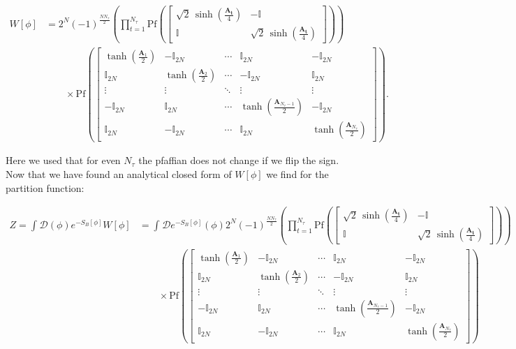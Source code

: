 \documentclass{article}
\begin{document}
\begin{align}
	W\left[ \phi \right] &= 2^{N} (-1)^{\frac{N N_\tau}{2}}
	\left(\prod_{t=1}^{N_\tau} \mathrm{Pf}\!\left(
	\begin{bmatrix}
		\sqrt{2}\,\sinh\!\left(\frac{\boldsymbol{A_t}}{4}\right) & -\mathbb{I} \\
		\mathbb{I} & \sqrt{2}\,\sinh\!\left(\frac{\boldsymbol{A_t}}{4}\right)
	\end{bmatrix}
	\right)\right) \nonumber \\
	&\quad\quad \times
	\mathrm{Pf} \left(	
	\begin{bmatrix}
		\tanh\!\left(\frac{{\boldsymbol{A}_1}}{2}\right) & -\mathbb{I}_{2N} & \cdots & \mathbb{I}_{2N} & -\mathbb{I}_{2N} \\
		\mathbb{I}_{2N} & \tanh\!\left(\frac{{\boldsymbol{A}_2}}{2}\right) & \cdots & -\mathbb{I}_{2N} & \mathbb{I}_{2N} \\
		\vdots & \vdots & \ddots & \vdots & \vdots \\
		-\mathbb{I}_{2N} & \mathbb{I}_{2N} & \cdots & \tanh\!\left(\frac{{\boldsymbol{A}_{N_\tau-1}}}{2}\right) & -\mathbb{I}_{2N} \\
		\mathbb{I}_{2N} & -\mathbb{I}_{2N} & \cdots & \mathbb{I}_{2N} & \tanh\!\left(\frac{{\boldsymbol{A}_{N_\tau}}}{2}\right)
	\end{bmatrix}
	\right).
\end{align}


Here we used that for even $N_{\tau}$ the pfaffian does not change if we flip the sign. Now that we have found an analytical closed form of $W\left[ \phi \right]$ we find for the partition function:


\begin{align}
	Z = \int_{ }^{ } \mathcal{D} \left(\phi\right) e^{-S_B\left[ \phi \right] } W \left[ \phi \right] &= \int_{ }^{ } \mathcal{D} e^{-S_B\left[ \phi \right] } \left(\phi\right) 2^{N} (-1)^{\frac{N N_\tau}{2}}
	\left(\prod_{t=1}^{N_\tau} \mathrm{Pf}\!\left(
	\begin{bmatrix}
		\sqrt{2}\,\sinh\!\left(\frac{\boldsymbol{A_t}}{4}\right) & -\mathbb{I} \\
		\mathbb{I} & \sqrt{2}\,\sinh\!\left(\frac{\boldsymbol{A_t}}{4}\right)
	\end{bmatrix}
	\right)\right) \nonumber \\
	&\quad\quad \times
	\mathrm{Pf} \left(	
	\begin{bmatrix}
		\tanh\!\left(\frac{{\boldsymbol{A}_1}}{2}\right) & -\mathbb{I}_{2N} & \cdots & \mathbb{I}_{2N} & -\mathbb{I}_{2N} \\
		\mathbb{I}_{2N} & \tanh\!\left(\frac{{\boldsymbol{A}_2}}{2}\right) & \cdots & -\mathbb{I}_{2N} & \mathbb{I}_{2N} \\
		\vdots & \vdots & \ddots & \vdots & \vdots \\
		-\mathbb{I}_{2N} & \mathbb{I}_{2N} & \cdots & \tanh\!\left(\frac{{\boldsymbol{A}_{N_\tau-1}}}{2}\right) & -\mathbb{I}_{2N} \\
		\mathbb{I}_{2N} & -\mathbb{I}_{2N} & \cdots & \mathbb{I}_{2N} & \tanh\!\left(\frac{{\boldsymbol{A}_{N_\tau}}}{2}\right)
	\end{bmatrix}
	\right)
\end{align}
\end{document}

